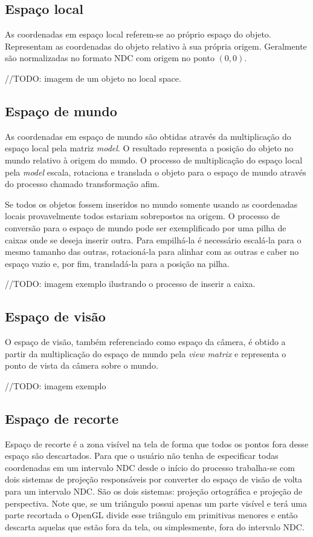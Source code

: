 \documentclass[12pt, 
openright, 
oneside, 
a4paper,    
brazil]{facom-ufu-abntex2}
\begin{document}
\subsection{Espaço local}
As coordenadas em espaço local referem-se ao próprio espaço do objeto. Representam as coordenadas do objeto relativo à sua própria origem. Geralmente são normalizadas no formato NDC com origem no ponto $(0,0)$.

//TODO: imagem de um objeto no local space.

\subsection{Espaço de mundo}
As coordenadas em espaço de mundo são obtidas através da multiplicação do espaço local pela matriz \textit{model}. O resultado representa a posição do objeto no mundo relativo à origem do mundo. O processo de multiplicação do espaço local pela \textit{model} escala, rotaciona e translada o objeto para o espaço de mundo através do processo chamado transformação afim.

Se todos os objetos fossem inseridos no mundo somente usando as coordenadas locais provavelmente todos estariam sobrepostos na origem. O processo de conversão para o espaço de mundo pode ser exemplificado por uma pilha de caixas onde se deseja inserir outra. Para empilhá-la é necessário escalá-la para o mesmo tamanho das outras, rotacioná-la para alinhar com as outras e caber no espaço vazio e, por fim, transladá-la para a posição na pilha.

//TODO: imagem exemplo ilustrando o processo de inserir a caixa.

\subsection{Espaço de visão}
O espaço de visão, também referenciado como espaço da câmera, é obtido a partir da multiplicação do espaço de mundo pela \textit{view matrix} e representa o ponto de vista da câmera sobre o mundo.

//TODO: imagem exemplo

\subsection{Espaço de recorte}
Espaço de recorte é a zona visível na tela de forma que todos os pontos fora desse espaço são descartados. Para que o usuário não tenha de especificar todas coordenadas em um intervalo NDC desde o início do processo trabalha-se com dois sistemas de projeção responsáveis por converter do espaço de visão de volta para um intervalo NDC. São os dois sistemas: projeção ortográfica e projeção de perspectiva.
Note que, se um triângulo possui apenas um parte visível e terá uma parte recortada o OpenGL divide esse triângulo em primitivas menores e então descarta aquelas que estão fora da tela, ou simplesmente, fora do intervalo NDC.
\end{document}
